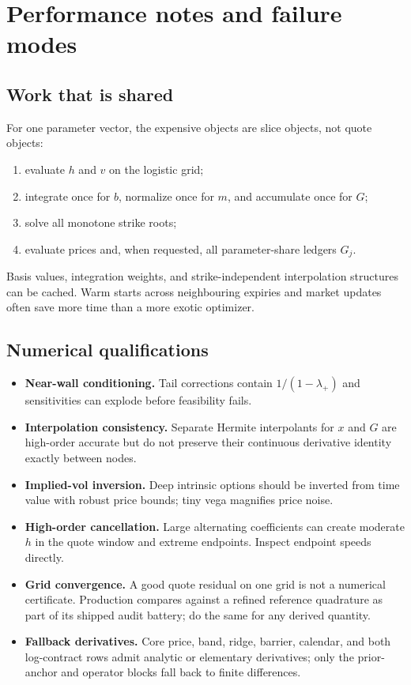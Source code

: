 \documentclass[11pt]{article}
\begin{document}
\section{Performance notes and failure modes}
\label{app:performance}

\subsection{Work that is shared}

For one parameter vector, the expensive objects are slice objects, not quote
objects:
\begin{enumerate}[leftmargin=1.6em]
\item evaluate $h$ and $v$ on the logistic grid;
\item integrate once for $b$, normalize once for $m$, and accumulate once for
  $G$;
\item solve all monotone strike roots;
\item evaluate prices and, when requested, all parameter-share ledgers $G_j$.
\end{enumerate}
Basis values, integration weights, and strike-independent interpolation
structures can be cached.  Warm starts across neighbouring expiries and market
updates often save more time than a more exotic optimizer.

\subsection{Numerical qualifications}

\begin{itemize}[leftmargin=1.4em]
\item \textbf{Near-wall conditioning.}  Tail corrections contain
  $1/(1-\lambda_+)$ and sensitivities can explode before feasibility fails.
\item \textbf{Interpolation consistency.}  Separate Hermite interpolants for
  $x$ and $G$ are high-order accurate but do not preserve their continuous
  derivative identity exactly between nodes.
\item \textbf{Implied-vol inversion.}  Deep intrinsic options should be
  inverted from time value with robust price bounds; tiny vega magnifies price
  noise.
\item \textbf{High-order cancellation.}  Large alternating coefficients can
  create moderate $h$ in the quote window and extreme endpoints.  Inspect
  endpoint speeds directly.
\item \textbf{Grid convergence.}  A good quote residual on one grid is not a
  numerical certificate.  Production compares against a refined reference
  quadrature as part of its shipped audit battery; do the same for any
  derived quantity.
\item \textbf{Fallback derivatives.}  Core price, band, ridge, barrier,
  calendar, and both log-contract rows admit analytic or elementary
  derivatives; only the prior-anchor and operator blocks fall back to
  finite differences.
\end{itemize}
\end{document}
